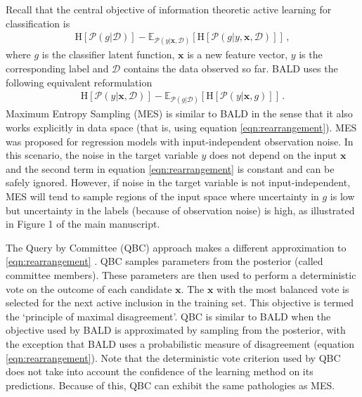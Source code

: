 \documentclass{article}
\newcommand{\x}{\mathbf{x}}
\newcommand{\data}{\mathcal{D}}
\newcommand{\ent}{\mathrm{H}}
\newcommand{\E}{\mathbb{E}}
\begin{document}
Recall that the central objective of information theoretic active learning for classification is
\begin{align}   
\ent[\mathcal{P}(g|\mathcal{D})] - \E_{\mathcal{P}(y|\mathbf{x},\data)} \left[ \ent[\mathcal{P}(g|y,\mathbf{x},\data)]\right]\,,
\label{eqn:ent_change}
\end{align}
where $g$ is the classifier latent function, $\x$ is a new feature vector, $y$ is the corresponding label and $\mathcal{D}$ contains
the data observed so far. BALD uses the following equivalent reformulation
\begin{align}
\ent[\mathcal{P}(y|\mathbf{x},\data)] - \E_{\mathcal{P}(g|\data)} \left[\ent\left[ \mathcal{P}(y|\mathbf{x},g)\right]\right]\,. \label{eqn:rearrangement} 
\end{align}
Maximum Entropy Sampling (MES) \citep{sebastiani2000} is similar to BALD in the sense that it also works explicitly in data space
(that is, using equation \eqref{eqn:rearrangement}). MES was proposed for regression models with input-independent observation noise.
In this scenario, the noise in the target variable $y$ does not depend on the input $\mathbf{x}$ and
the second term in equation \eqref{eqn:rearrangement} is constant and can be safely ignored.
However, if noise in the target variable is not input-independent, MES will tend to sample regions of the input space
where uncertainty in $g$ is low but uncertainty in the labels (because of observation noise) is high,
as illustrated in Figure 1 of the main manuscript.

The Query by Committee (QBC) approach makes a different approximation to \eqref{eqn:rearrangement} \citep{freund1997}.
QBC samples parameters from the posterior (called committee members). These parameters are then used to perform a deterministic vote on
the outcome of each candidate $\x$. The $\x$ with the most balanced vote is selected for the next active inclusion in the training set.
This objective is termed the `principle of maximal disagreement'. QBC is similar to
BALD when the objective used by BALD is approximated by sampling from the posterior, with the exception
that BALD uses a probabilistic measure of disagreement (equation \eqref{eqn:rearrangement}).
Note that the deterministic vote criterion used by QBC does not take into account
the confidence of the learning method on its predictions. Because of this, QBC can exhibit the same pathologies as MES.
\end{document}
